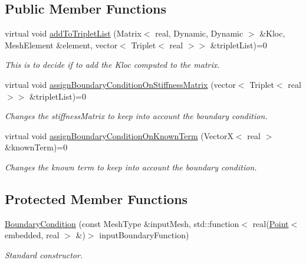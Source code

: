 \subsection*{\-Public \-Member \-Functions}
\begin{DoxyCompactItemize}
\item 
virtual void \hyperlink{class_boundary_condition_aba7cce27bd46f51026701a11ddca04f8}{add\-To\-Triplet\-List} (\-Matrix$<$ real, \-Dynamic, \-Dynamic $>$ \&\-Kloc, \-Mesh\-Element \&element, vector$<$ \-Triplet$<$ real $>$$>$ \&triplet\-List)=0
\begin{DoxyCompactList}\small\item\em \-This is to decide if to add the \-Kloc computed to the matrix. \end{DoxyCompactList}\item 
\hypertarget{class_boundary_condition_a19b5c27271977f40146d867ff281ad24}{virtual void \hyperlink{class_boundary_condition_a19b5c27271977f40146d867ff281ad24}{assign\-Boundary\-Condition\-On\-Stiffness\-Matrix} (vector$<$ \-Triplet$<$ real $>$$>$ \&triplet\-List)=0}\label{class_boundary_condition_a19b5c27271977f40146d867ff281ad24}

\begin{DoxyCompactList}\small\item\em \-Changes the stiffness\-Matrix to keep into account the boundary condition. \end{DoxyCompactList}\item 
\hypertarget{class_boundary_condition_a6bec19c145f0cae03d30cb2c2ea80594}{virtual void \hyperlink{class_boundary_condition_a6bec19c145f0cae03d30cb2c2ea80594}{assign\-Boundary\-Condition\-On\-Known\-Term} (\-Vector\-X$<$ real $>$ \&known\-Term)=0}\label{class_boundary_condition_a6bec19c145f0cae03d30cb2c2ea80594}

\begin{DoxyCompactList}\small\item\em \-Changes the known term to keep into account the boundary condition. \end{DoxyCompactList}\end{DoxyCompactItemize}
\subsection*{\-Protected \-Member \-Functions}
\begin{DoxyCompactItemize}
\item 
\hypertarget{class_boundary_condition_a93813e79c791932c9e10eb919e0ec371}{\hyperlink{class_boundary_condition_a93813e79c791932c9e10eb919e0ec371}{\-Boundary\-Condition} (const \-Mesh\-Type \&input\-Mesh, std\-::function$<$ real(\hyperlink{class_point}{\-Point}$<$ embedded, real $>$ \&)$>$ input\-Boundary\-Function)}\label{class_boundary_condition_a93813e79c791932c9e10eb919e0ec371}

\begin{DoxyCompactList}\small\item\em \-Standard constructor. \end{DoxyCompactList}\end{DoxyCompactItemize}
